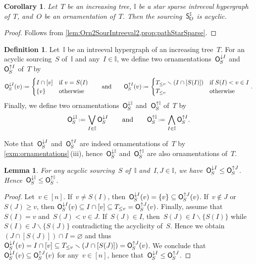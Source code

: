 \documentclass{amsart}
\newtheorem{corollary}[theorem]{Corollary}
\newtheorem{lemma}[theorem]{Lemma}
\theoremstyle{definition}
\newtheorem{definition}[theorem]{Definition}
\newcommand{\ssm}{\smallsetminus} %
\newcommand{\eqdef}{\mbox{\,\raisebox{0.2ex}{\scriptsize\ensuremath{\mathrm:}}\ensuremath{=}\,}} %
\newcommand{\bigMeet}{\bigwedge} %
\newcommand{\bigJoin}{\bigvee} %
\newcommand{\lessin}[2]{#1_{\le#2}} %
\newcommand{\mymap}[2]{\mathsf{#1}_{\hspace{-.7pt}#2}}
\newcommand{\minorn}[2]{\mymap{O}{#1}^{\downarrow#2}}  %
\newcommand{\maxorn}[2]{\mymap{O}{#1}^{\uparrow#2}}  %
\newcommand{\sour}[1]{\mymap{S}{#1}}  %
\newcommand{\II}{\mathbb I} %
\begin{document}
\begin{corollary}
\label{coro:Orn2SourIntreeval3}
Let~$T$ be an increasing tree, $\II$ be a star sparse intreeval hypergraph of~$T$, and~$O$ be an ornamentation of~$T$.
Then the sourcing~$\sour{O}^\II$ is acyclic.
\end{corollary}

\begin{proof}
Follows from \cref{lem:Orn2SourIntreeval2,prop:pathStarSparse}.
\end{proof}


\begin{definition}
Let~$\II$ be an intreeval hypergraph of an increasing tree~$T$.
For an acyclic sourcing~$S$ of~$\II$ and any~$I \in \II$, we define two ornamentations~$\minorn{S}{I}$ and~$\maxorn{S}{I}$ of~$T$ by
\[
\minorn{S}{I}(v) \eqdef \begin{cases} I \cap [v] & \text{if } v = S(I) \\ \{v\} & \text{otherwise} \end{cases}
\qquad\text{and}\qquad
\maxorn{S}{I}(v) \eqdef  \begin{cases} \lessin{T}{v} \ssm (I \cap [S(I)]) & \text{if } S(I) < v \in I \\ \lessin{T}{v} & \text{otherwise} \end{cases}
.
\]
Finally, we define two ornamentations~$\minorn{S}{\II}$ and~$\maxorn{S}{\II}$ of~$T$ by
\[
\minorn{S}{\II} \eqdef \bigJoin_{I \in \II} \minorn{S}{I}
\qquad\text{and}\qquad
\maxorn{S}{\II} \eqdef \bigMeet_{I \in \II} \maxorn{S}{I}
.
\]
\end{definition}

Note that~$\minorn{S}{I}$ and~$\maxorn{S}{I}$ are indeed ornamentations of~$T$ by \cref{exm:ornamentations}\,(iii), hence~$\minorn{S}{\II}$ and~$\maxorn{S}{\II}$ are also ornamentations of~$T$.

\begin{lemma}
\label{lem:Sour2OrnIntreeval1}
For any acyclic sourcing~$S$ of~$\II$ and~$I, J \in \II$, we have~$\minorn{S}{I} \le \maxorn{S}{J}$.
Hence~$\minorn{S}{\II} \le \maxorn{S}{\II}$.
\end{lemma}

\begin{proof}
Let~$v \in [n]$.
If~$v \ne S(I)$, then~$\minorn{S}{I}(v) = \{v\} \subseteq \maxorn{S}{J}(v)$.
If~$v \notin J$ or~$S(J) \ge v$, then ${\minorn{S}{I}(v) \subseteq I \cap [v] \subseteq \lessin{T}{v} = \maxorn{S}{J}(v)}$.
Finally, assume that~$S(I) = v$ and~$S(J) < v \in J$.
If~$S(J) \in I$, then~$S(J) \in I \ssm \{S(I)\}$ while~$S(I) \in J \ssm \{S(J)\}$ contradicting the acyclicity of~$S$.
Hence we obtain~$(J \cap [S(J)]) \cap I = \varnothing$ and thus~$\minorn{S}{I}(v) = I \cap [v] \subseteq \lessin{T}{v} \ssm (J \cap [S(J)])= \maxorn{S}{J}(v)$.
We conclude that~$\minorn{S}{I}(v) \subseteq \maxorn{S}{J}(v)$ for any~$v \in [n]$, hence that~$\minorn{S}{I} \le \maxorn{S}{J}$.
\end{proof}
\end{document}
